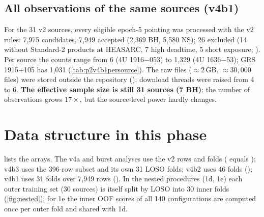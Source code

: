\subsection{All observations of the same sources (v4b1)}
For the 31 v2 sources, every eligible epoch-5 pointing was processed with the v2 rules: 7,975 candidates, 7,949 accepted
(2,369 BH, 5,580 NS); 26 excluded (14 without Standard-2 products at HEASARC, 7 high deadtime, 5 short exposure;
). Per source the counts range from 6 (4U 1916$-$053) to 1,329 (4U 1636$-$53);
GRS 1915+105 has 1,031 (\cref{tab:p2v4b1persource}). The raw files ($\approx2$\,GB, $\approx30{,}000$ files) were stored
outside the repository (); download threads were raised from 4 to 6. \textbf{The effective sample
size is still 31 sources (7 BH)}: the number of observations grows $17\times$, but the source-level power hardly changes.

\section{Data structure in this phase}\label{sec:p2structure}
 lists the arrays. The v4a and burst analyses use the v2 rows and folds
( equals ); v4b3 uses the 396-row subset and its own
31 LOSO folds; v4b2 uses 46 folds (); v4b1 uses 31 folds over 7,949 rows
(). In the nested procedures (1d, 1e) each outer training set (30 sources) is itself split
by LOSO into 30 inner folds (\cref{fig:nested}); for 1e the inner OOF scores of all 140 configurations are computed once per
outer fold and shared with 1d.

